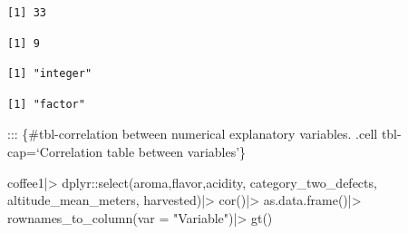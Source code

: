 \documentclass[
  letterpaper,
  DIV=11,
  numbers=noendperiod]{scrartcl}
\newenvironment{Shaded}{\begin{snugshade}}{\end{snugshade}}
\newcommand{\AttributeTok}[1]{\textcolor[rgb]{0.40,0.45,0.13}{#1}}
\newcommand{\FunctionTok}[1]{\textcolor[rgb]{0.28,0.35,0.67}{#1}}
\newcommand{\NormalTok}[1]{\textcolor[rgb]{0.00,0.23,0.31}{#1}}
\newcommand{\SpecialCharTok}[1]{\textcolor[rgb]{0.37,0.37,0.37}{#1}}
\newcommand{\StringTok}[1]{\textcolor[rgb]{0.13,0.47,0.30}{#1}}
\begin{document}
\begin{Shaded}
\end{Shaded}

\begin{verbatim}
[1] 33
\end{verbatim}

\begin{Shaded}
\end{Shaded}

\begin{verbatim}
[1] 9
\end{verbatim}

\begin{Shaded}
\end{Shaded}

\begin{verbatim}
[1] "integer"
\end{verbatim}

\begin{Shaded}
\end{Shaded}

\begin{verbatim}
[1] "factor"
\end{verbatim}

::: \{\#tbl-correlation between numerical explanatory variables. .cell
tbl-cap=`Correlation table between variables'\}

\begin{Shaded}
\begin{Highlighting}[]
\NormalTok{coffee1}\SpecialCharTok{|\textgreater{}}
\NormalTok{  dplyr}\SpecialCharTok{::}\FunctionTok{select}\NormalTok{(aroma,flavor,acidity,}
\NormalTok{         category\_two\_defects,}
\NormalTok{         altitude\_mean\_meters,}
\NormalTok{         harvested)}\SpecialCharTok{|\textgreater{}}
  \FunctionTok{cor}\NormalTok{()}\SpecialCharTok{|\textgreater{}}
  \FunctionTok{as.data.frame}\NormalTok{()}\SpecialCharTok{|\textgreater{}}
  \FunctionTok{rownames\_to\_column}\NormalTok{(}\AttributeTok{var =} \StringTok{"Variable"}\NormalTok{)}\SpecialCharTok{|\textgreater{}}
  \FunctionTok{gt}\NormalTok{()}
\end{Highlighting}
\end{Shaded}
\end{document}
